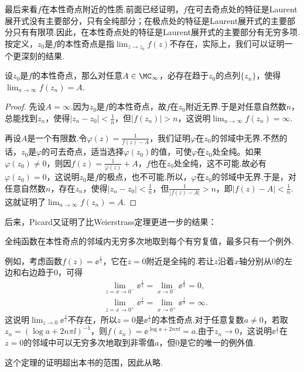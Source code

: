 最后来看$f$在本性奇点附近的性质.前面已经证明，$f$在可去奇点处的特征是Laurent展开式没有主要部分，只有全纯部分；在极点处的特征是Laurent展开式的主要部分只有有限项.因此，在本性奇点处的特征是Laurent展开式的主要部分有无穷多项.按定义，$z_0$是$f$的本性奇点是指$\lim_{z\to z_0}f(z)$不存在，实际上，我们可以证明一个更深刻的结果.
\begin{theorem}\label{thm5.2.5}
设$z_0$是$f$的本性奇点，那么对任意$A\in\MC_\infty$，必存在趋于$z_0$的点列$\{z_n\}$，使得$\lim_{n\to\infty}f(z_n)=A$.
\end{theorem}
\begin{proof}
先设$A=\infty$.因为$z_0$是$f$的本性奇点，故$f$在$z_0$附近无界.于是对任意自然数$n$，总能找到$z_n$，使得$|z_n-z_0|<\frac1n$，但$|f(z_n)|>n$，这说明$\lim_{n\to\infty}f(z_n)=\infty$.

再设$A$是一个有限数.令$\varphi(z)=\frac1{f(z)-A}$，我们证明$\varphi$在$z_0$的邻域中无界.不然的话，$z_0$是$\varphi$的可去奇点，适当选择$\varphi(z_0)$的值，可使$\varphi$在$z_0$处全纯。如果$\varphi(z_0)\ne0$，则因$f(z)=\frac1{\varphi(z)}+A$，$f$也在$z_0$处全纯，这不可能.故必有$\varphi(z_0)=0$，这说明$z_0$是$f$的极点，也不可能.所以，$\varphi$在$z_0$的邻域中无界.于是，对任意自然数$n$，存在$z_n$，使得$|z_n-z_0|<\frac1n$，但$\frac1{|f(z)-A|}>n$，即$|f(z)-A|<\frac1n$.这就证明了$\lim_{n\to\infty}f(z_n)=A$.
\end{proof}

后来，Picard又证明了比Weierstrass定理更进一步的结果：
\begin{theorem}\label{thm5.2.6}
全纯函数在本性奇点的邻域内无穷多次地取到每个有穷复值，最多只有一个例外.
\end{theorem}

例如，考虑函数$f(z)=\ee^{\frac1z}$，它在$z=0$附近是全纯的.若让$z$沿着$x$轴分别从$0$的左边和右边趋于$0$，可得
\begin{align*}
&\lim_{z=x\to0^-}\ee^{\frac1z}=\lim_{x\to0^-}\ee^{\frac1x}=0,\\
&\lim_{z=x\to0^+}\ee^{\frac1z}=\lim_{x\to0^+}\ee^{\frac1x}=\infty.
\end{align*}
这说明$\lim_{z\to0}\ee^{\frac1z}$不存在，所以$z=0$是$\ee^{\frac1z}$的本性奇点.对于任意复数$a\ne0$，若取$z_n=(\log a+2n\pi\ii)^{-1}$，则$f(z_n)=\ee^{\log a+2n\pi\ii}=a$.由于$z_n\to0$，这说明$\ee^{\frac1z}$在$z=0$的邻域中可以无穷多次地取到非零值$a$，但$0$是它的唯一的例外值.

这个定理的证明超出本书的范围，因此从略.

